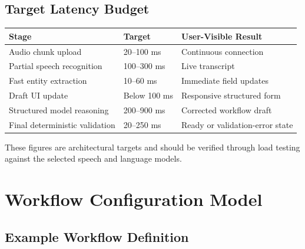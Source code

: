 \documentclass[11pt,a4paper]{article}
\begin{document}
\subsection{Target Latency Budget}

\begin{tabularx}{\textwidth}{Y L{34mm} Y}
\toprule
\textbf{Stage} & \textbf{Target} & \textbf{User-Visible Result} \\
\midrule
Audio chunk upload
& 20--100 ms
& Continuous connection \\

Partial speech recognition
& 100--300 ms
& Live transcript \\

Fast entity extraction
& 10--60 ms
& Immediate field updates \\

Draft UI update
& Below 100 ms
& Responsive structured form \\

Structured model reasoning
& 200--900 ms
& Corrected workflow draft \\

Final deterministic validation
& 20--250 ms
& Ready or validation-error state \\
\bottomrule
\end{tabularx}

These figures are architectural targets and should be verified through
load testing against the selected speech and language models.

\section{Workflow Configuration Model}

\subsection{Example Workflow Definition}
\end{document}
